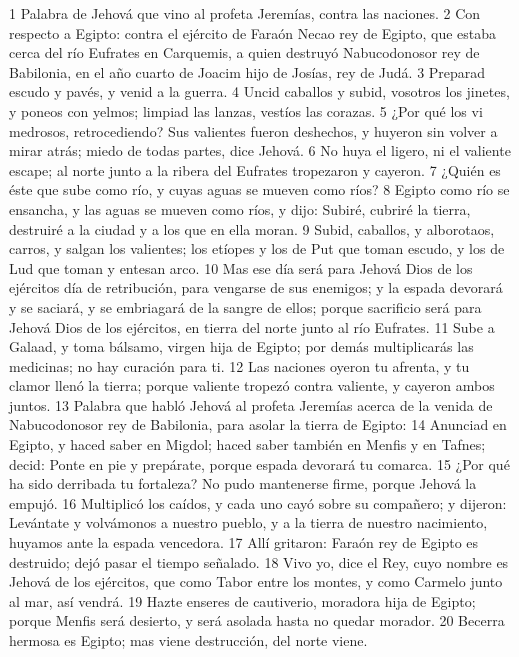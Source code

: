 1 Palabra de Jehová que vino al profeta Jeremías, contra las naciones.
2 Con respecto a Egipto: contra el ejército de Faraón Necao rey de Egipto, que estaba cerca del río Eufrates en Carquemis, a quien destruyó Nabucodonosor rey de Babilonia, en el año cuarto de Joacim hijo de Josías, rey de Judá.
3 Preparad escudo y pavés, y venid a la guerra.
4 Uncid caballos y subid, vosotros los jinetes, y poneos con yelmos; limpiad las lanzas, vestíos las corazas.
5 ¿Por qué los vi medrosos, retrocediendo? Sus valientes fueron deshechos, y huyeron sin volver a mirar atrás; miedo de todas partes, dice Jehová.
6 No huya el ligero, ni el valiente escape; al norte junto a la ribera del Eufrates tropezaron y cayeron.
7 ¿Quién es éste que sube como río, y cuyas aguas se mueven como ríos?
8 Egipto como río se ensancha, y las aguas se mueven como ríos, y dijo: Subiré, cubriré la tierra, destruiré a la ciudad y a los que en ella moran.
9 Subid, caballos, y alborotaos, carros, y salgan los valientes; los etíopes y los de Put que toman escudo, y los de Lud que toman y entesan arco.
10 Mas ese día será para Jehová Dios de los ejércitos día de retribución, para vengarse de sus enemigos; y la espada devorará y se saciará, y se embriagará de la sangre de ellos; porque sacrificio será para Jehová Dios de los ejércitos, en tierra del norte junto al río Eufrates.
11 Sube a Galaad, y toma bálsamo, virgen hija de Egipto; por demás multiplicarás las medicinas; no hay curación para ti.
12 Las naciones oyeron tu afrenta, y tu clamor llenó la tierra; porque valiente tropezó contra valiente, y cayeron ambos juntos.
13 Palabra que habló Jehová al profeta Jeremías acerca de la venida de Nabucodonosor rey de Babilonia, para asolar la tierra de Egipto: 
14 Anunciad en Egipto, y haced saber en Migdol; haced saber también en Menfis y en Tafnes; decid: Ponte en pie y prepárate, porque espada devorará tu comarca.
15 ¿Por qué ha sido derribada tu fortaleza? No pudo mantenerse firme, porque Jehová la empujó.
16 Multiplicó los caídos, y cada uno cayó sobre su compañero; y dijeron: Levántate y volvámonos a nuestro pueblo, y a la tierra de nuestro nacimiento, huyamos ante la espada vencedora.
17 Allí gritaron: Faraón rey de Egipto es destruido; dejó pasar el tiempo señalado.
18 Vivo yo, dice el Rey, cuyo nombre es Jehová de los ejércitos, que como Tabor entre los montes, y como Carmelo junto al mar, así vendrá.
19 Hazte enseres de cautiverio, moradora hija de Egipto; porque Menfis será desierto, y será asolada hasta no quedar morador.
20 Becerra hermosa es Egipto; mas viene destrucción, del norte viene.
